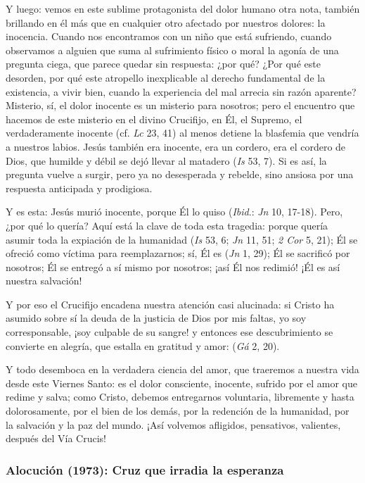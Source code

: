 \begin{body}
Y luego: vemos en este sublime protagonista del dolor humano otra nota, también brillando en él más que en cualquier otro afectado por nuestros dolores: la inocencia. Cuando nos encontramos con un niño que está sufriendo, cuando observamos a alguien que suma al sufrimiento físico o moral la agonía de una pregunta ciega, que parece quedar sin respuesta: ¿por qué? ¿Por qué este desorden, por qué este atropello inexplicable al derecho fundamental de la existencia, a vivir bien, cuando la experiencia del mal arrecia sin razón aparente? Misterio, sí, el dolor inocente es un misterio para nosotros; pero el encuentro que hacemos de este misterio en el divino Crucifijo, en Él, el Supremo, el verdaderamente inocente (cf. \textit{Lc} 23, 41) al menos detiene la blasfemia que vendría a nuestros labios. Jesús también era inocente, era un cordero, era el cordero de Dios, que humilde y débil se dejó llevar al matadero (\textit{Is} 53, 7). Si es así, la pregunta vuelve a surgir, pero ya no desesperada y rebelde, sino ansiosa por una respuesta anticipada y prodigiosa.

Y es esta: Jesús murió inocente, porque Él lo quiso (\textit{Ibid}.: \textit{Jn} 10, 17-18). Pero, ¿por qué lo quería? Aquí está la clave de toda esta tragedia: porque quería asumir toda la expiación de la humanidad (\textit{Is} 53, 6; \textit{Jn} 11, 51; \textit{2 Cor} 5, 21); Él se ofreció como víctima para reemplazarnos; sí, Él es  (\textit{Jn} 1, 29); Él se sacrificó por nosotros; Él se entregó a sí mismo por nosotros; ¡así Él nos redimió! ¡Él es así nuestra salvación! 

Y por eso el Crucifijo encadena nuestra atención casi alucinada: si Cristo ha asumido sobre sí la deuda de la justicia de Dios por mis faltas, yo soy corresponsable, ¡soy culpable de su sangre! y entonces ese descubrimiento se convierte en alegría, que estalla en gratitud y amor:  (\textit{Gá} 2, 20). 

Y todo desemboca en la verdadera ciencia del amor, que traeremos a nuestra vida desde este Viernes Santo: es el dolor consciente, inocente, sufrido por el amor que redime y salva; como Cristo, debemos entregarnos voluntaria, libremente y hasta dolorosamente, por el bien de los demás, por la redención de la humanidad, por la salvación y la paz del mundo. ¡Así volvemos afligidos, pensativos, valientes, después del Vía Crucis!
\end{body}


\subsubsection{Alocución (1973): Cruz que irradia la esperanza}


